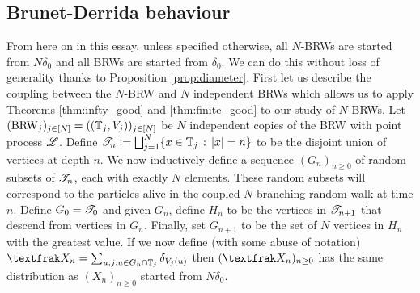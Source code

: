\subsection{Brunet-Derrida behaviour}\label{sec:ExpTails_BrunDer}
From here on in this essay, unless specified otherwise, all $N$-BRWs are started from $N\delta_0$ and all BRWs are started from $\delta_0$. We can do this without loss of generality thanks to Proposition \ref{prop:diameter}. First let us describe the coupling between the $N$-BRW and $N$ independent BRWs which allows us to apply Theorems \ref{thm:infty_good} and \ref{thm:finite_good} to our study of $N$-BRWs. Let $(\text{BRW}_j)_{j \in [N]} = ((\mathbb{T}_j, V_j))_{j \in [N]}$ be $N$ independent copies of the BRW with point process $\mathscr{L}$. Define $\mathscr{T}_n \vcentcolon= \bigsqcup_{j=1}^N \{ x \in \mathbb{T}_j \,:\, |x|=n \}$ to be the disjoint union of vertices at depth $n$. We now inductively define a sequence $(G_n)_{n \geq 0}$ of random subsets of $\mathscr{T}_n$, each with exactly $N$ elements. These random subsets will correspond to the particles alive in the coupled $N$-branching random walk at time $n$. Define $G_0 = \mathscr{T}_0$ and given $G_n$, define $H_n$ to be the vertices in $\mathscr{T}_{n+1}$ that descend from vertices in $G_n$. Finally, set $G_{n+1}$ to be the set of $N$ vertices in $H_n$ with the greatest value. If we now define (with some abuse of notation) $\frak{X}_n = \sum_{u,j : u \in G_n \cap \bb{T}_j} \delta_{V_j(u)}$ then $(\frak{X}_n)_{n \geq 0}$ has the same distribution as $(X_n)_{n \geq 0}$ started from $N \delta_0$. 

